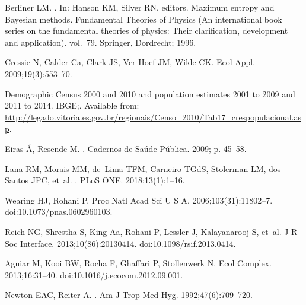 \documentclass[10pt,letterpaper]{article}
\begin{document}
\begin{thebibliography}{10}
Berliner LM.
.
\newblock In: Hanson KM, Silver RN, editors. Maximum entropy and Bayesian
  methods. Fundamental Theories of Physics (An international book series on the
  fundamental theories of physics: Their clarification, development and
  application). vol.~79. Springer, Dordrecht; 1996.

Cressie N, Calder Ca, Clark JS, {Ver Hoef} JM, Wikle CK.
\newblock Ecol Appl. 2009;19(3):553--70.

Demographic Census 2000 and 2010 and population estimates 2001 to 2009 and 2011
  to 2014.
\newblock IBGE;.
\newblock Available from:
  \url{http://legado.vitoria.es.gov.br/regionais/Censo_2010/Tab17_crespopulacional.asp}.

Eiras {\'{A}}, Resende M.
.
\newblock Cadernos de Sa{\'{u}}de P{\'{u}}blica. 2009; p. 45--58.

Lana RM, Morais MM, de~Lima TFM, Carneiro TGdS, Stolerman LM, dos Santos JPC,
  et~al.
.
\newblock PLoS ONE. 2018;13(1):1--16.

Wearing HJ, Rohani P.
\newblock Proc Natl Acad Sci U S A. 2006;103(31):11802--7.
\newblock doi:{10.1073/pnas.0602960103}.

Reich NG, Shrestha S, King Aa, Rohani P, Lessler J, Kalayanarooj S, et~al.
\newblock J R Soc Interface. 2013;10(86):20130414.
\newblock doi:{10.1098/rsif.2013.0414}.

Aguiar M, Kooi BW, Rocha F, Ghaffari P, Stollenwerk N.
\newblock Ecol Complex. 2013;16:31--40.
\newblock doi:{10.1016/j.ecocom.2012.09.001}.

Newton EAC, Reiter A.
.
\newblock Am J Trop Med Hyg. 1992;47(6):709--720.


\end{thebibliography}
\end{document}
